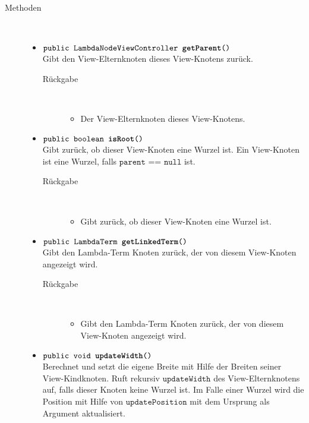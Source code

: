 \begin{description}
\item[Methoden] \hfill \\
	\vspace{-.8cm}
	\begin{itemize}
		\item $\texttt{public LambdaNodeViewController \textbf{getParent}()}$ \\ Gibt den View-Elternknoten dieses View-Knotens zurück.
		\begin{description}
			\item[Rückgabe] \hfill \\
			\vspace{-.8cm}
			\begin{itemize}
				\item Der View-Elternknoten dieses View-Knotens.
			\end{itemize}
		\end{description}
		
		\item $\texttt{public boolean \textbf{isRoot}()}$ \\ Gibt zurück, ob dieser View-Knoten eine Wurzel ist. Ein View-Knoten ist eine Wurzel, falls $\texttt{parent == null}$ ist.
		\begin{description}
			\item[Rückgabe] \hfill \\
			\vspace{-.8cm}
			\begin{itemize}
				\item Gibt zurück, ob dieser View-Knoten eine Wurzel ist.
			\end{itemize}
		\end{description}
		
		\item $\texttt{public LambdaTerm \textbf{getLinkedTerm}()}$ \\ Gibt den Lambda-Term Knoten zurück, der von diesem View-Knoten angezeigt wird.
		\begin{description}
			\item[Rückgabe] \hfill \\
			\vspace{-.8cm}
			\begin{itemize}
				\item Gibt den Lambda-Term Knoten zurück, der von diesem View-Knoten angezeigt wird.
			\end{itemize}
		\end{description}
		
		\item $\texttt{public void \textbf{updateWidth}()}$ \\ Berechnet und setzt die eigene Breite mit Hilfe der Breiten seiner View-Kindknoten. Ruft rekursiv $\texttt{updateWidth}$ des View-Elternknotens auf, falls dieser Knoten keine Wurzel ist. Im Falle einer Wurzel wird die Position mit Hilfe von $\texttt{updatePosition}$ mit dem Ursprung als Argument aktualisiert. %
		

\end{itemize}
\end{description}
